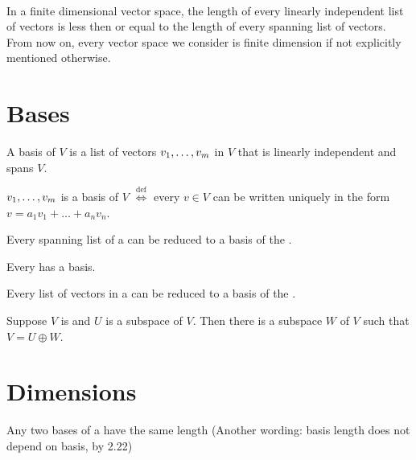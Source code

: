 \setcounter{thm}{21}

\begin{thm}
    \\
    In a finite dimensional vector space, the length of every linearly independent list of vectors is less then or equal to the length of every spanning list of vectors. From now on, every vector space we consider is finite dimension if not explicitly mentioned otherwise.
\end{thm}


\section{Bases}

\setcounter{thm}{25}
\begin{mydef}
    A basis of $V$ is a list of vectors $v_1, \dots, v_m$ in $V$ that is linearly independent and spans $V$.
\end{mydef}


\setcounter{thm}{27}
\begin{mydef} 
    $v_1, \dots, v_m$ is a basis of $V$ $\overset{\text{def}}{\iff}$ every $v \in V$ can be written uniquely in the form $v=a_1 v_1 + \dots + a_n v_n$. 
\end{mydef}

\setcounter{thm}{29}
\begin{thm} Every spanning list of a \vs can be reduced to a basis of the \vs.
\end{thm}

\setcounter{thm}{30}
\begin{thm} Every \findimvs has a basis.\end{thm}

\begin{thm} Every \lid list of vectors in a  \findimvs can be reduced to a basis of the \vs. \end{thm}

\begin{thm} Suppose $V$ is \fd and $U$ is a subspace of $V$. Then there is a subspace $W$ of $V$ such that $V=U \oplus W$. \end{thm}

\section{Dimensions}

\setcounter{thm}{33}
\begin{thm} Any two bases of a \fdvs have the same length (Another wording: basis length does not depend on basis, by 2.22)
\end{thm}


